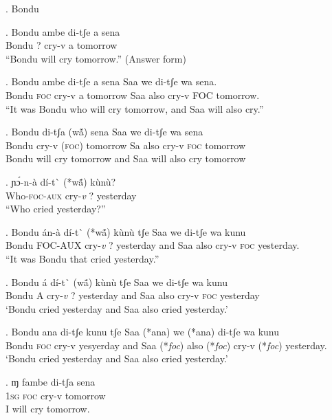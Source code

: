 \documentclass{assets/fieldnotes}
\begin{document}
\ex. Bondu

\exg. Bondu ambe di-tʃe a sena\\
Bondu ? cry-v a tomorrow\\
``Bondu will cry tomorrow.'' (Answer form)


\exg. Bondu ambe di-tʃe a sena Saa we di-tʃe wa sena.\\
Bondu \textsc{foc} cry-v a tomorrow Saa also cry-v FOC tomorrow.\\
``It was Bondu who will cry tomorrow, and Saa will also cry.''

\exg. Bondu di-tʃa (w\'ã) sena Saa we di-tʃe wa sena\\
Bondu cry-v (\textsc{foc}) tomorrow Sa also cry-v \textsc{foc} tomorrow\\
Bondu will cry tomorrow and Saa will also cry tomorrow



\exg. ɲɔ́-n-à dí-t\`{} (*wã́) kùnù?\\
Who-\textsc{foc-aux} cry-\textit{v} ? yesterday\\
``Who cried yesterday?''

\exg. Bondu án-à dí-t\`{} (*wã́) kùnù tʃe Saa we di-tʃe wa kunu\\
Bondu \textsc{FOC-AUX} cry-\textit{v} ? yesterday and Saa also cry-v \textsc{foc} yesterday.\\
``It was Bondu that cried yesterday.''

\exg. Bondu \'{a} d\'{i}-t\`{} (wã́) k\`{u}n\`{u} tʃe Saa we di-tʃe wa kunu\\
Bondu A cry-\textit{v} ? yesterday and Saa also cry-v \textsc{foc} yesterday\\
`Bondu cried yesterday and Saa also cried yesterday.'

\exg. Bondu ana di-tʃe kunu tʃe Saa (*ana) we (*ana) di-tʃe wa kunu\\
Bondu \textsc{foc} cry-v yesyerday and Saa (*\textit{foc}) also (*\textit{foc}) cry-v (*\textit{foc}) yesterday.\\
`Bondu cried yesterday and Saa also cried yesterday.'

\exg. ɱ fambe di-tʃa sena\\
1\textsc{sg} \textsc{foc} cry-v tomorrow\\
I will cry tomorrow. 
\end{document}

